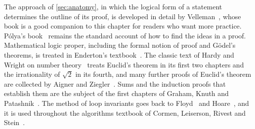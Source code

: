 The approach of \cref{sec:anatomy}, in which the logical form of a statement determines the outline of its proof, is developed in detail by Velleman~\cite{velleman2019}, whose book is a good companion to this chapter for readers who want more practice. P\'olya's book~\cite{polya1945} remains the standard account of how to find the ideas in a proof. Mathematical logic proper, including the formal notion of proof and G\"odel's theorems, is treated in Enderton's textbook~\cite{enderton2001}. The classic text of Hardy and Wright on number theory~\cite{hardywright2008} treats Euclid's theorem in its first two chapters and the irrationality of $\sqrt2$ in its fourth, and many further proofs of Euclid's theorem are collected by Aigner and Ziegler~\cite{aigner2018proofs}. Sums and the induction proofs that establish them are the subject of the first chapters of Graham, Knuth and Patashnik~\cite{graham1994concrete}. The method of loop invariants goes back to Floyd~\cite{floyd1967} and Hoare~\cite{hoare1969}, and it is used throughout the algorithms textbook of Cormen, Leiserson, Rivest and Stein~\cite{cormen2022}.

\chapterreferences
